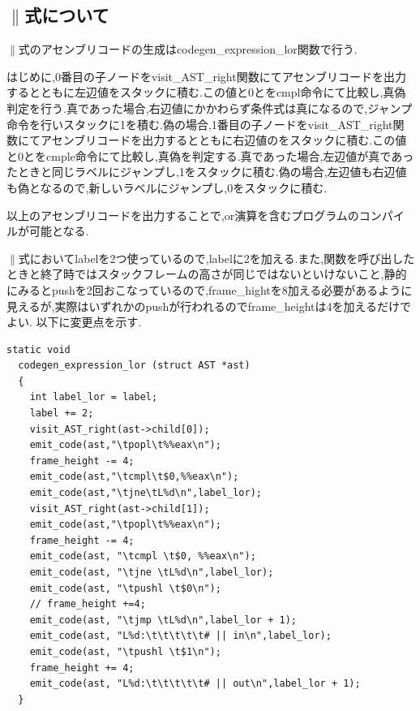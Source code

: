 \documentclass[10pt]{jsarticle}
\begin{document}
\subsection{$\parallel$式について}
$\parallel$式のアセンブリコードの生成はcodegen\_expression\_lor関数で行う.
\par はじめに,0番目の子ノードをvisit\_AST\_right関数にてアセンブリコードを出力するとともに左辺値をスタックに積む.この値と0とをcmpl命令にて比較し,真偽判定を行う.真であった場合,右辺値にかかわらず条件式は真になるので,ジャンプ命令を行いスタックに1を積む.偽の場合,1番目の子ノードをvisit\_AST\_right関数にてアセンブリコードを出力するとともに右辺値のをスタックに積む.この値と0とをcmple命令にて比較し,真偽を判定する.真であった場合,左辺値が真であったときと同じラベルにジャンプし,1をスタックに積む.偽の場合,左辺値も右辺値も偽となるので,新しいラベルにジャンプし,0をスタックに積む.
\par 以上のアセンブリコードを出力することで,or演算を含むプログラムのコンパイルが可能となる.\\
\par $\parallel$式においてlabelを2つ使っているので,labelに2を加える.また,関数を呼び出したときと終了時ではスタックフレームの高さが同じではないといけないこと,静的にみるとpushを2回おこなっているので,frame\_hightを8加える必要があるように見えるが,実際はいずれかのpushが行われるのでframe\_heightは4を加えるだけでよい.
以下に変更点を示す.
\begin{lstlisting}[caption=codegen\_expression\_lor関数]
  static void
  codegen_expression_lor (struct AST *ast)
  {
    int label_lor = label;
    label += 2;
    visit_AST_right(ast->child[0]);
    emit_code(ast,"\tpopl\t%%eax\n");
    frame_height -= 4;
    emit_code(ast,"\tcmpl\t$0,%%eax\n");
    emit_code(ast,"\tjne\tL%d\n",label_lor);
    visit_AST_right(ast->child[1]);
    emit_code(ast,"\tpopl\t%%eax\n");
    frame_height -= 4;
    emit_code(ast, "\tcmpl \t$0, %%eax\n");
    emit_code(ast, "\tjne \tL%d\n",label_lor);
    emit_code(ast, "\tpushl \t$0\n");
    // frame_height +=4;
    emit_code(ast, "\tjmp \tL%d\n",label_lor + 1);
    emit_code(ast, "L%d:\t\t\t\t\t# || in\n",label_lor);
    emit_code(ast, "\tpushl \t$1\n");
    frame_height += 4;
    emit_code(ast, "L%d:\t\t\t\t\t# || out\n",label_lor + 1);
  }
\end{lstlisting}
\end{document}
